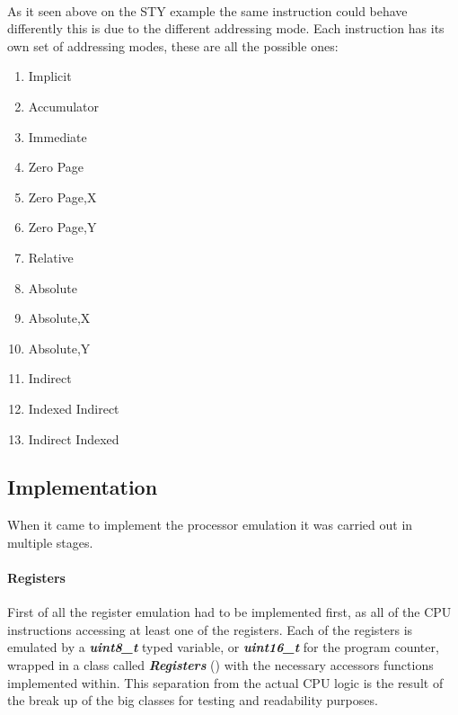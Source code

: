 \documentclass[]{report}
\begin{document}
\paragraph{ }
As it seen above on the STY example the same instruction could behave differently this is due to the different addressing mode. Each instruction has its own set of addressing modes,  these are all the possible ones: 

\begin{enumerate}
	\item Implicit
	\item Accumulator
	\item Immediate
	\item Zero Page
	\item Zero Page,X
	\item Zero Page,Y
	\item Relative
	\item Absolute
	\item Absolute,X
	\item Absolute,Y
	\item Indirect
	\item Indexed Indirect
	\item Indirect Indexed
\end{enumerate}

\subsection{Implementation}
When it came to implement the processor emulation it was carried out in multiple stages.
\paragraph{Registers}
First of all the register emulation had to be implemented first, as all of the CPU instructions accessing at least one of the registers. Each of the registers is emulated by a \textbf{\textit{uint8\_t}} typed variable, or  \textbf{\textit{uint16\_t}} for the program counter, wrapped in a class called  \textbf{\textit{Registers}} (\cite{DREG}) with the necessary accessors functions implemented within. This separation from the actual CPU logic is the result of the break up of the big classes for testing and readability purposes.
\end{document}
